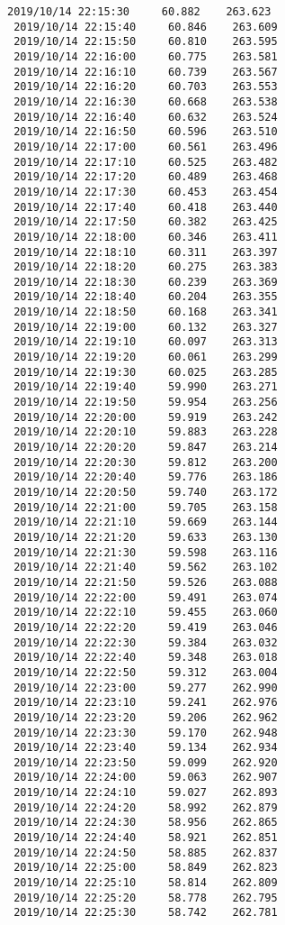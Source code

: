 \documentclass[11pt]{article}
\begin{document}
\begin{Verbatim}[commandchars=\\\{\}]
 2019/10/14 22:15:30     60.882    263.623
 2019/10/14 22:15:40     60.846    263.609
 2019/10/14 22:15:50     60.810    263.595
 2019/10/14 22:16:00     60.775    263.581
 2019/10/14 22:16:10     60.739    263.567
 2019/10/14 22:16:20     60.703    263.553
 2019/10/14 22:16:30     60.668    263.538
 2019/10/14 22:16:40     60.632    263.524
 2019/10/14 22:16:50     60.596    263.510
 2019/10/14 22:17:00     60.561    263.496
 2019/10/14 22:17:10     60.525    263.482
 2019/10/14 22:17:20     60.489    263.468
 2019/10/14 22:17:30     60.453    263.454
 2019/10/14 22:17:40     60.418    263.440
 2019/10/14 22:17:50     60.382    263.425
 2019/10/14 22:18:00     60.346    263.411
 2019/10/14 22:18:10     60.311    263.397
 2019/10/14 22:18:20     60.275    263.383
 2019/10/14 22:18:30     60.239    263.369
 2019/10/14 22:18:40     60.204    263.355
 2019/10/14 22:18:50     60.168    263.341
 2019/10/14 22:19:00     60.132    263.327
 2019/10/14 22:19:10     60.097    263.313
 2019/10/14 22:19:20     60.061    263.299
 2019/10/14 22:19:30     60.025    263.285
 2019/10/14 22:19:40     59.990    263.271
 2019/10/14 22:19:50     59.954    263.256
 2019/10/14 22:20:00     59.919    263.242
 2019/10/14 22:20:10     59.883    263.228
 2019/10/14 22:20:20     59.847    263.214
 2019/10/14 22:20:30     59.812    263.200
 2019/10/14 22:20:40     59.776    263.186
 2019/10/14 22:20:50     59.740    263.172
 2019/10/14 22:21:00     59.705    263.158
 2019/10/14 22:21:10     59.669    263.144
 2019/10/14 22:21:20     59.633    263.130
 2019/10/14 22:21:30     59.598    263.116
 2019/10/14 22:21:40     59.562    263.102
 2019/10/14 22:21:50     59.526    263.088
 2019/10/14 22:22:00     59.491    263.074
 2019/10/14 22:22:10     59.455    263.060
 2019/10/14 22:22:20     59.419    263.046
 2019/10/14 22:22:30     59.384    263.032
 2019/10/14 22:22:40     59.348    263.018
 2019/10/14 22:22:50     59.312    263.004
 2019/10/14 22:23:00     59.277    262.990
 2019/10/14 22:23:10     59.241    262.976
 2019/10/14 22:23:20     59.206    262.962
 2019/10/14 22:23:30     59.170    262.948
 2019/10/14 22:23:40     59.134    262.934
 2019/10/14 22:23:50     59.099    262.920
 2019/10/14 22:24:00     59.063    262.907
 2019/10/14 22:24:10     59.027    262.893
 2019/10/14 22:24:20     58.992    262.879
 2019/10/14 22:24:30     58.956    262.865
 2019/10/14 22:24:40     58.921    262.851
 2019/10/14 22:24:50     58.885    262.837
 2019/10/14 22:25:00     58.849    262.823
 2019/10/14 22:25:10     58.814    262.809
 2019/10/14 22:25:20     58.778    262.795
 2019/10/14 22:25:30     58.742    262.781

\end{Verbatim}
\end{document}
